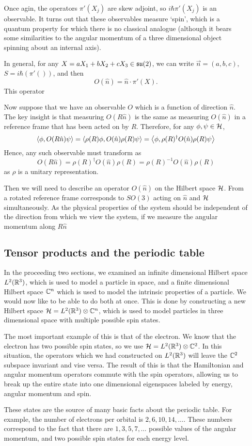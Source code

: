\documentclass[a4paper]{article}
\begin{document}
Once agin, the operators $\pi'(X_j)$ are skew adjoint, so $i\hbar\pi'(X_j)$ is an observable. It turns out that these observables measure `spin', which is a quantum property for which there is no classical analogue (although it bears some similarities to the angular momentum of a three dimensional object spinning about an internal axis). 

In general, for any $X = a X_1 + b X_2 + c X_3 \in \mathfrak{su}(2)$, we can write $\vec{n} = (a, b, c)$, $S = i\hbar(\pi'())$, and then 
$$O(\hat{n}) = \hat{n}\cdot \pi'(X).$$
This operator 

Now suppose that we have an observable $O$ which is a function of direction $\hat{n}$. The key insight is that measuring $O(R\hat{n})$ is the same as measuring $O(\hat{n})$ in a reference frame that has been acted on by $R$. Therefore, for any $\phi, \psi \in \mathcal{H}$, 
$$\left\langle \phi , O(R\hat{n})\psi \right\rangle = \left\langle \rho(R)\phi , O(\hat{n})\rho(R)\psi \right\rangle= \left\langle \phi , \rho(R)^\dagger O(\hat{n})\rho(R)\psi \right\rangle$$
Hence, any such observable must transform as  
$$O(R\hat{n}) = \rho(R)^\dagger O(\hat{n})\rho(R) = \rho(R)^{-1} O(\hat{n})\rho(R)$$
as $\rho$ is a unitary representation.

Then we will need to describe an operator $O(\hat{n})$ on the Hilbert space $\mathcal{H}$. From a rotated reference frame corresponds to $SO(3)$ acting on $\hat{n}$ and $\mathcal{H}$ simultaneously. As the physical properties of the system should be independent of the direction from which we view the system, if we measure the angular momentum along $R\hat{n}$

\subsection{Tensor products and the periodic table}
In the proceeding two sections, we examined an infinite dimensional Hilbert space $L^2(\mathbb{R}^3)$, which is used to model a particle in space, and a finite dimensional Hilbert space $\mathbb{C}^n$ which is used to model the intrinsic properties of a particle. We would now like to be able to do both at once. This is done by constructing a new Hilbert space $\mathcal{H} = L^2(\mathbb{R}^3) \otimes \mathbb{C}^n$, which is used to model particles in three dimensional space with multiple possible spin states.

The most important example of this is that of the electron. We know that the electron has two possible spin states, so we use $\mathcal{H} = L^2(\mathbb{R}^3) \otimes \mathbb{C}^2$. In this situation, the operators which we had constructed on $L^2(\mathbb{R}^3)$ will leave the $\mathbb{C}^2$ subspace invariant and vise versa. The result of this is that the Hamiltonian and angular momentum operators commute with the spin operators, allowing us to break up the entire state into one dimensional eigenspaces labeled by energy, angular momentum and spin. 

These states are the source of many basic facts about the periodic table. For example, the number of electrons per orbital is $2, 6, 10, 14, \hdots$. These numbers correspond to the fact that there are $1, 3, 5, 7, \hdots$ possible values of the angular momentum, and two possible spin states for each energy level.

 

\end{document}
